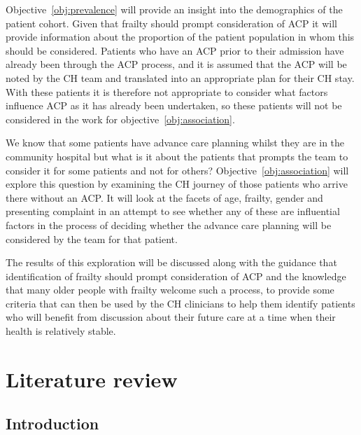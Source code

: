 \documentclass
[
	12pt,
	a4paper,
	oneside,
]{report}
\begin{document}
Objective~\ref{obj:prevalence} will provide an insight into the demographics
of the patient cohort. Given that frailty should prompt consideration of ACP
it will provide information about the proportion of the patient population in
whom this should be considered. Patients who have an ACP prior to their admission
have already been through the ACP process, and it is assumed that the ACP will be 
noted by the CH team and translated into an appropriate plan for their CH stay.
With these patients it is therefore not appropriate to consider what factors 
influence ACP as it has already been undertaken, so these patients will not
be considered in the work for objective~\ref{obj:association}.

We know that some patients have advance care planning whilst they are in the
community hospital but what is it about the patients that prompts the team to
consider it for some patients and not for others?
Objective~\ref{obj:association} will explore this question by examining the CH
journey of those patients 
who arrive there without an ACP. It will look at the facets of age, frailty, 
gender and presenting complaint in an attempt to see whether any of these are
influential factors in the process of deciding whether the advance care planning
will be considered by the team for that patient.

The results of this exploration will be discussed along with the guidance that 
identification of frailty should prompt consideration of ACP and the knowledge
that many older people with frailty welcome such a process, to provide some 
criteria that can then be used by the CH clinicians to help them identify 
patients who will benefit from discussion about their future care at a time 
when their health is relatively stable.



\chapter{Literature review}

\section{Introduction}
\end{document}
